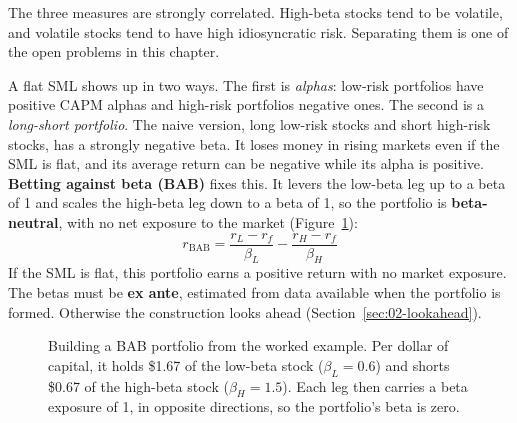 The three measures are strongly correlated. High-beta stocks tend to be volatile, and volatile stocks tend to have high idiosyncratic risk. Separating them is one of the open problems in this chapter.

A flat SML shows up in two ways. The first is \emph{alphas}: low-risk portfolios have positive CAPM alphas and high-risk portfolios negative ones. The second is a \emph{long-short portfolio}. The naive version, long low-risk stocks and short high-risk stocks, has a strongly negative beta. It loses money in rising markets even if the SML is flat, and its average return can be negative while its alpha is positive. \textbf{Betting against beta (BAB)} fixes this. It levers the low-beta leg up to a beta of 1 and scales the high-beta leg down to a beta of 1, so the portfolio is \textbf{beta-neutral}, with no net exposure to the market (Figure~\ref{fig:05-bab}):
\begin{equation}
  r_{\mathrm{BAB}} = \frac{r_L - r_f}{\beta_L} - \frac{r_H - r_f}{\beta_H}
  \label{eq:05-bab}
\end{equation}
If the SML is flat, this portfolio earns a positive return with no market exposure. The betas must be \textbf{ex ante}, estimated from data available when the portfolio is formed. Otherwise the construction looks ahead (Section~\ref{sec:02-lookahead}).

\begin{figure}[htbp]
\centering
{}
\caption{Building a BAB portfolio from the worked example. Per dollar of capital, it holds \$1.67 of the low-beta stock ($\beta_L = 0.6$) and shorts \$0.67 of the high-beta stock ($\beta_H = 1.5$). Each leg then carries a beta exposure of 1, in opposite directions, so the portfolio's beta is zero.}
\label{fig:05-bab}
\end{figure}

